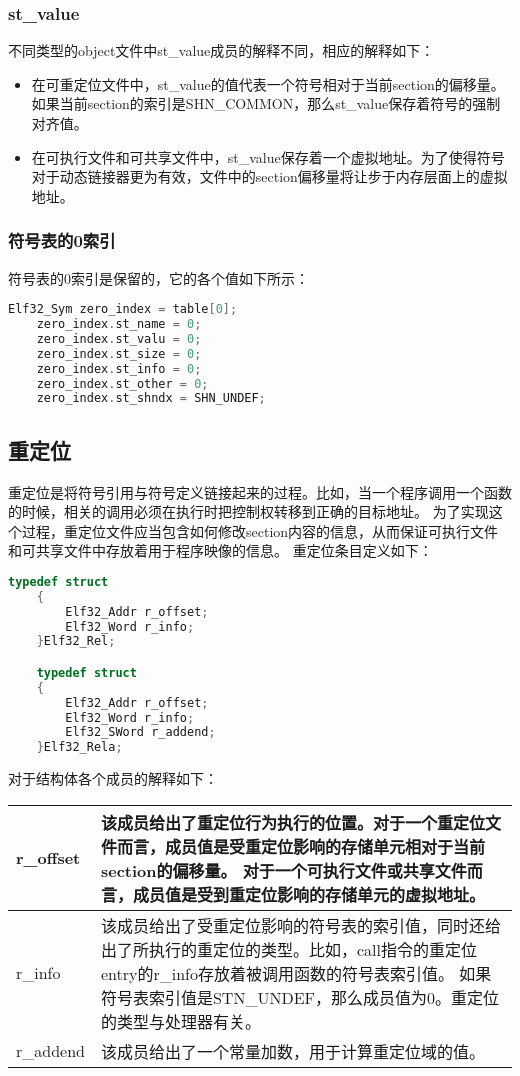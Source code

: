 \documentclass[a4paper,left=2.5cm,right=2.5cm,11pt]{article}
\newcommand{\interval}{\vspace{0.5em}}
\begin{document}
\subsubsection{st\_value}
	不同类型的object文件中st\_value成员的解释不同，相应的解释如下：
	\begin{itemize}
		\item 在可重定位文件中，st\_value的值代表一个符号相对于当前section的偏移量。如果当前section的索引是SHN\_COMMON，那么st\_value保存着符号的强制对齐值。
		\item 在可执行文件和可共享文件中，st\_value保存着一个虚拟地址。为了使得符号对于动态链接器更为有效，文件中的section偏移量将让步于内存层面上的虚拟地址。
	\end{itemize}

\subsubsection{符号表的0索引}
	符号表的0索引是保留的，它的各个值如下所示：
	\begin{lstlisting}[language = C]
	Elf32_Sym zero_index = table[0];
	zero_index.st_name = 0;
	zero_index.st_valu = 0;
	zero_index.st_size = 0;
	zero_index.st_info = 0;
	zero_index.st_other = 0;
	zero_index.st_shndx = SHN_UNDEF;
	\end{lstlisting}

\subsection{重定位}
	重定位是将符号引用与符号定义链接起来的过程。比如，当一个程序调用一个函数的时候，相关的调用必须在执行时把控制权转移到正确的目标地址。
	为了实现这个过程，重定位文件应当包含如何修改section内容的信息，从而保证可执行文件和可共享文件中存放着用于程序映像的信息。
	重定位条目定义如下：
	\begin{lstlisting}[language = C]
	typedef struct
	{
		Elf32_Addr r_offset;
		Elf32_Word r_info;
	}Elf32_Rel;

	typedef struct
	{
		Elf32_Addr r_offset;
		Elf32_Word r_info;
		Elf32_SWord r_addend;
	}Elf32_Rela;
	\end{lstlisting}

	对于结构体各个成员的解释如下：
	\interval
	\begin{longtable}{p{3cm}p{7cm}}
	\hline
	r\_offset & 该成员给出了重定位行为执行的位置。对于一个重定位文件而言，成员值是受重定位影响的存储单元相对于当前section的偏移量。
			    对于一个可执行文件或共享文件而言，成员值是受到重定位影响的存储单元的虚拟地址。\\
	\hline
	r\_info & 该成员给出了受重定位影响的符号表的索引值，同时还给出了所执行的重定位的类型。比如，call指令的重定位entry的r\_info存放着被调用函数的符号表索引值。
			  如果符号表索引值是STN\_UNDEF，那么成员值为0。重定位的类型与处理器有关。\\
	\hline
	r\_addend & 该成员给出了一个常量加数，用于计算重定位域的值。\\
	\hline
	\end{longtable}
	\interval
\end{document}
